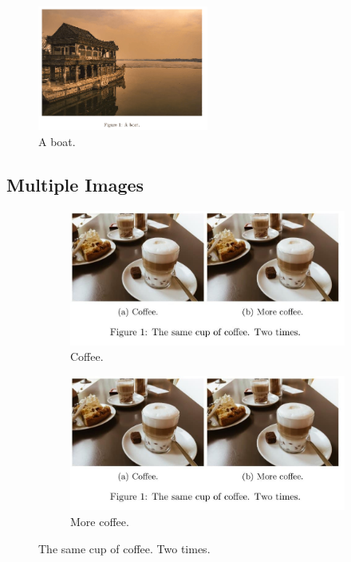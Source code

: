 \documentclass{article}
\begin{document}
\begin{figure}[t]
    \caption{A boat.}
    \includegraphics[width=0.5\textwidth]{boat.png}
    
    \label{fig:boat1}
  \end{figure}
  

  \subsection{Multiple Images}

\begin{figure}[t]
    \centering
    \begin{subfigure}[b]{0.4\linewidth}
      \includegraphics[width=\linewidth]{coffee.jpg}
      \caption{Coffee.}
    \end{subfigure}
    
    \begin{subfigure}[b]{0.4\linewidth}
      \includegraphics[width=\linewidth]{coffee.jpg}
      \caption{More coffee.}
    \end{subfigure}
    \caption{The same cup of coffee. Two times.}
    \label{fig:coffee}
  \end{figure}
  
\end{document}
